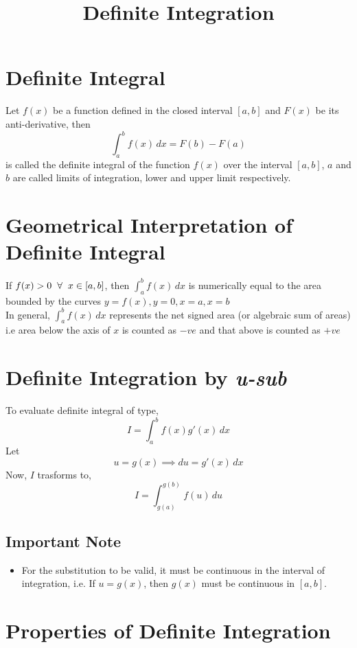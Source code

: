 \documentclass{article}
\title{Definite Integration}
\author{}
\date{}
\begin{document}
\maketitle

\section{Definite Integral}
Let $f(x)$ be a function defined in the closed interval $[a,b]$ and $F(x)$ be its anti-derivative, then $$\displaystyle\int_{a}^{b} f(x) \, dx=F(b)-F(a) $$
is called the definite integral of the function $f(x)$ over the interval $[a,b]$, $a$ and $b$ are called limits of integration, lower and upper limit respectively.

\section{Geometrical Interpretation of Definite Integral}
If $f(x)>0 \hspace{2mm} \forall \hspace{2mm} x \in [a,b]$, then $\displaystyle\int_{a}^{b} f(x) \, dx $ is numerically equal to the area bounded by the curves $y=f(x), y=0, x=a, x=b$
\\
In general, $\displaystyle\int_{a}^{b} f(x) \, dx $ represents the net signed area (or algebraic sum of areas) i.e area below the axis of $x$ is counted as $-ve$ and that above is counted as $+ve$

\section{Definite Integration by \textit{u-sub}}
To evaluate definite integral of type, $$I=\displaystyle\int_{a}^{b} f(x)g'(x) \, dx $$
Let $$u=g(x) \implies du=g'(x) \, dx$$
Now, $I$ trasforms to, $$I=\displaystyle\int_{g(a)}^{g(b)} f(u) \, du $$
\subsection*{Important Note}
\begin{itemize}
    \item For the substitution to be valid, it must be continuous in the interval of integration, i.e. If $u=g(x)$, then $g(x)$ must be continuous in $[a,b]$.
\end{itemize}

\section{Properties of Definite Integration}
\end{document}
